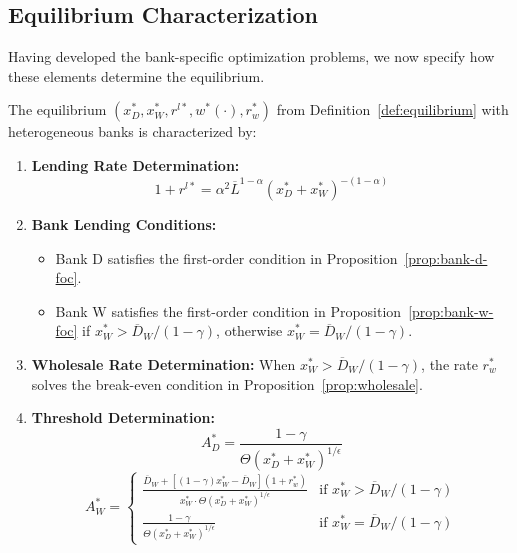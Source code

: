 \documentclass[12pt]{article}
\begin{document}
\subsection{Equilibrium Characterization}
Having developed the bank-specific optimization problems, we now specify how these elements determine the equilibrium.

\begin{proposition}\label{prop:char}
The equilibrium $(x_{D}^{*}, x_{W}^{*}, r^{l*}, w^{*}(\cdot), r_{w}^{*})$ from Definition~\ref{def:equilibrium} with heterogeneous banks is characterized by:
\begin{enumerate}
    \item \textbf{Lending Rate Determination:}
    \begin{equation}
        1+r^{l*} = \alpha^{2}\overline{L}^{1-\alpha}(x_{D}^{*}+x_{W}^{*})^{-(1-\alpha)}
    \end{equation}
    \item \textbf{Bank Lending Conditions:}
    \begin{itemize}
        \item Bank D satisfies the first-order condition in Proposition~\ref{prop:bank-d-foc}.
        \item Bank W satisfies the first-order condition in Proposition~\ref{prop:bank-w-foc} if $x_{W}^{*} > \overline{D}_{W}/(1-\gamma)$, otherwise $x_{W}^{*} = \overline{D}_{W}/(1-\gamma)$.
    \end{itemize}
    \item \textbf{Wholesale Rate Determination:} When $x_{W}^{*} > \overline{D}_{W}/(1-\gamma)$, the rate $r_{w}^{*}$ solves the break-even condition in Proposition~\ref{prop:wholesale}.
    \item \textbf{Threshold Determination:}
    \begin{equation}
        A_{D}^{*} = \frac{1-\gamma}{\Theta(x_{D}^{*}+x_{W}^{*})^{1/\epsilon}}
    \end{equation}
    \begin{equation}
        A_{W}^{*} = \begin{cases} \frac{\overline{D}_{W}+[(1-\gamma)x_{W}^{*}-\overline{D}_{W}](1+r_{w}^{*})}{x_{W}^{*} \cdot \Theta(x_{D}^{*}+x_{W}^{*})^{1/\epsilon}} & \text{if } x_{W}^{*} > \overline{D}_{W}/(1-\gamma) \\ \frac{1-\gamma}{\Theta(x_{D}^{*}+x_{W}^{*})^{1/\epsilon}} & \text{if } x_{W}^{*} = \overline{D}_{W}/(1-\gamma) \end{cases}
    \end{equation}
\end{enumerate}
\end{proposition}
\end{document}
